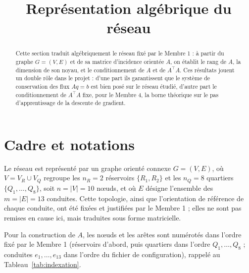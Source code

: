 \documentclass[11pt,a4paper]{article}
\title{\textbf{Représentation algébrique du réseau}}
\date{}
\theoremstyle{plain}
\theoremstyle{definition}
\theoremstyle{remark}
\begin{document}
\maketitle
\vspace{-4em}

\begin{abstract}
\noindent
Cette section traduit algébriquement le réseau fixé par le Membre 1 : à
partir du graphe $G=(V,E)$ et de sa matrice d'incidence orientée $A$, on
établit le rang de $A$, la dimension de son noyau, et le conditionnement de
$A$ et de $A^\top A$. Ces résultats jouent un double rôle dans le projet :
d'une part ils garantissent que le système de conservation des flux
$Aq = b$ est bien posé sur le réseau étudié, d'autre part le
conditionnement de $A^\top A$ fixe, pour le Membre 4, la borne théorique sur
le pas d'apprentissage de la descente de gradient.
\end{abstract}

\section{Cadre et notations}

Le réseau est représenté par un graphe orienté connexe $G = (V, E)$, où
$V = V_R \cup V_Q$ regroupe les $n_R = 2$ réservoirs $\{R_1, R_2\}$ et les
$n_Q = 8$ quartiers $\{Q_1, \dots, Q_8\}$, soit $n = |V| = 10$ nœuds, et où
$E$ désigne l'ensemble des $m = |E| = 13$ conduites. Cette topologie, ainsi
que l'orientation de référence de chaque conduite, ont été fixées et
justifiées par le Membre 1 ; elles ne sont pas remises en cause ici, mais
traduites sous forme matricielle.

Pour la construction de $A$, les nœuds et les arêtes sont numérotés dans
l'ordre fixé par le Membre 1 (réservoirs d'abord, puis quartiers dans
l'ordre $Q_1, \dots, Q_8$ ; conduites $e_1, \dots, e_{13}$ dans l'ordre du
fichier de configuration), rappelé au Tableau~\ref{tab:indexation}.
\end{document}
